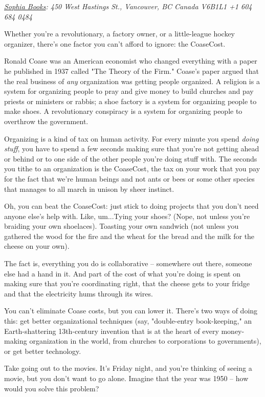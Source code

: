 \emph{\href{http://www.sophiabooks.com/}{Sophia Books}: 450 West Hastings St., Vancouver, BC Canada V6B1L1 +1 604 684 0484}

Whether you're a revolutionary, a factory owner, or a little-league
hockey organizer, there's one factor you can't afford to ignore:
the CoaseCost.

Ronald Coase was an American economist who changed everything with
a paper he published in 1937 called "The Theory of the Firm."
Coase's paper argued that the real business of \emph{any}
organization was getting people organized. A religion is a system
for organizing people to pray and give money to build churches and
pay priests or ministers or rabbis; a shoe factory is a system for
organizing people to make shoes. A revolutionary conspiracy is a
system for organizing people to overthrow the government.

Organizing is a kind of tax on human activity. For every minute you
spend \emph{doing stuff}, you have to spend a few seconds making
sure that you're not getting ahead or behind or to one side of the
other people you're doing stuff with. The seconds you tithe to an
organization is the CoaseCost, the tax on your work that you pay
for the fact that we're human beings and not ants or bees or some
other species that manages to all march in unison by sheer
instinct.

Oh, you can beat the CoaseCost: just stick to doing projects that
you don't need anyone else's help with. Like, um...Tying your
shoes? (Nope, not unless you're braiding your own shoelaces).
Toasting your own sandwich (not unless you gathered the wood for
the fire and the wheat for the bread and the milk for the cheese on
your own).

The fact is, everything you do is collaborative -- somewhere out
there, someone else had a hand in it. And part of the cost of what
you're doing is spent on making sure that you're coordinating
right, that the cheese gets to your fridge and that the electricity
hums through its wires.

You can't eliminate Coase costs, but you can lower it. There's two
ways of doing this: get better organizational techniques (say,
"double-entry book-keeping," an Earth-shattering 13th-century
invention that is at the heart of every money-making organization
in the world, from churches to corporations to governments), or get
better technology.

Take going out to the movies. It's Friday night, and you're
thinking of seeing a movie, but you don't want to go alone. Imagine
that the year was 1950 -- how would you solve this problem?

